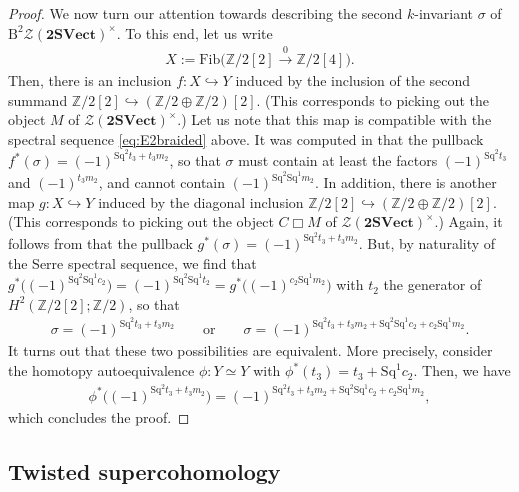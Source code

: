 \documentclass[10pt,a4paper]{amsart}
\numberwithin{equation}{section}
\begin{document}
\begin{proof}
We now turn our attention towards describing the second $k$-invariant $\sigma$ of $\mathrm{B}^2\mathscr{Z}(\mathbf{2SVect})^{\times}$. To this end, let us write
\begin{gather*}
X:=\mathrm{Fib}\big(\mathbb{Z}/2[2]\xrightarrow{0}\mathbb{Z}/2[4]\big).
\end{gather*}
 Then, there is an inclusion $f\colon X\hookrightarrow Y$ induced by the inclusion of the second summand $\mathbb{Z}/2[2]\hookrightarrow (\mathbb{Z}/2\oplus\mathbb{Z}/2)[2]$. (This corresponds to picking out the object $M$ of $\mathscr{Z}(\mathbf{2SVect})^{\times}$.) Let us note that this map is compatible with the spectral sequence \eqref{eq:E2braided} above. It was computed in \cite[Theorem~3.2]{JFR} that the pullback $f^*(\sigma) = (-1)^{\mathrm{Sq}^2t_3 + t_3m_2}$, so that $\sigma$ must contain at least the factors $(-1)^{\mathrm{Sq}^2t_3}$ and $(-1)^{t_3m_2}$, and cannot contain $(-1)^{\mathrm{Sq}^2\mathrm{Sq}^1m_2}$. In addition, there is another map $g\colon X\hookrightarrow Y$ induced by the diagonal inclusion $\mathbb{Z}/2[2]\hookrightarrow (\mathbb{Z}/2\oplus\mathbb{Z}/2)[2]$. (This corresponds to picking out the object $C\Box M$ of $\mathscr{Z}(\mathbf{2SVect})^{\times}$.) Again, it follows from \cite[Theorem~3.2]{JFR} that the pullback $g^*(\sigma) = (-1)^{\mathrm{Sq}^2t_3 + t_3m_2}$. But, by naturality of the Serre spectral sequence, we find that $g^*\big((-1)^{\mathrm{Sq}^2\mathrm{Sq}^1c_2}\big) = (-1)^{\mathrm{Sq}^2\mathrm{Sq}^1t_2} = g^*\big((-1)^{c_2\mathrm{Sq}^1m_2}\big)$ with $t_2$ the generator of $H^2(\mathbb{Z}/2[2];\mathbb{Z}/2)$, so that
 \begin{gather*}
 \sigma = (-1)^{\mathrm{Sq}^2t_3 + t_3m_2}\qquad \text{or}\qquad \sigma = (-1)^{\mathrm{Sq}^2t_3 + t_3m_2 + \mathrm{Sq}^2\mathrm{Sq}^1c_2 + c_2\mathrm{Sq}^1m_2}.
 \end{gather*}
 It turns out that these two possibilities are equivalent. More precisely, consider the homotopy autoequivalence $\phi\colon Y\simeq Y$ with $\phi^*(t_3) = t_3 + \mathrm{Sq}^1c_2$. Then, we have
 \begin{gather*}
 \phi^*\big((-1)^{\mathrm{Sq}^2t_3 + t_3m_2}\big) = (-1)^{\mathrm{Sq}^2t_3 + t_3m_2 + \mathrm{Sq}^2\mathrm{Sq}^1c_2 + c_2\mathrm{Sq}^1m_2},
 \end{gather*}
which concludes the proof.
\end{proof}

\subsection{Twisted supercohomology}
\end{document}
